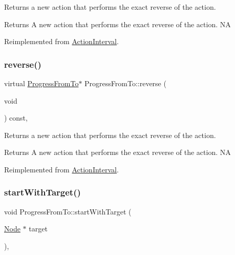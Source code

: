 Returns a new action that performs the exact reverse of the action.

\begin{DoxyReturn}{Returns}
A new action that performs the exact reverse of the action.  NA 
\end{DoxyReturn}


Reimplemented from \hyperlink{classActionInterval_a9f9ac7164036a0bc261a72f62a2b2da7}{Action\+Interval}.

\mbox{\label{classProgressFromTo_a78eb94326ecd704d53e0455d5f8341f5}} 
\subsubsection{\texorpdfstring{reverse()}{reverse()}\hspace{0.1cm}{\footnotesize\ttfamily [2/2]}}
{\footnotesize\ttfamily virtual \hyperlink{classProgressFromTo}{Progress\+From\+To}$\ast$ Progress\+From\+To\+::reverse (\begin{DoxyParamCaption}\item[{void}]{ }\end{DoxyParamCaption}) const\hspace{0.3cm}{\ttfamily [override]}, {\ttfamily [virtual]}}

Returns a new action that performs the exact reverse of the action.

\begin{DoxyReturn}{Returns}
A new action that performs the exact reverse of the action.  NA 
\end{DoxyReturn}


Reimplemented from \hyperlink{classActionInterval_a9f9ac7164036a0bc261a72f62a2b2da7}{Action\+Interval}.

\mbox{\label{classProgressFromTo_a27405d1d6988dc13852ff8a1c1fd6b2f}} 
\subsubsection{\texorpdfstring{start\+With\+Target()}{startWithTarget()}\hspace{0.1cm}{\footnotesize\ttfamily [1/2]}}
{\footnotesize\ttfamily void Progress\+From\+To\+::start\+With\+Target (\begin{DoxyParamCaption}\item[{\hyperlink{classNode}{Node} $\ast$}]{target }\end{DoxyParamCaption})\hspace{0.3cm}{\ttfamily [override]}, {\ttfamily [virtual]}}

